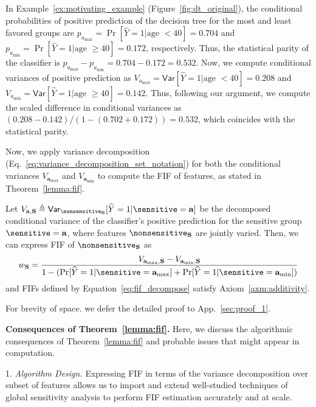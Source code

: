 \begin{example}
	In Example~\ref{ex:motivating_example} (Figure~\ref{fig:dt_original}), the conditional probabilities of positive prediction of the decision tree for the most and least favored groups are $  p_{a_{\max}} = \Pr[\widehat{Y} = 1 | \text{age } < 40] = 0.704 $ and $ p_{a_{\min}} = \Pr[\widehat{Y} = 1 | \text{age } \ge 40] = 0.172 $, respectively. Thus, the statistical parity of the classifier is $ p_{a_{\max}} - p_{a_{\min}} = 0.704 - 0.172 =  0.532 $. Now, we compute conditional variances of positive prediction as $ V_{a_{\max}} = \mathsf{Var}[\widehat{Y} = 1| \text{age } < 40] = 0.208 $ and $ V_{a_{\min}} = \mathsf{Var}[\widehat{Y} = 1| \text{age } \ge 40] = 0.142 $. Thus, following our argument, we compute the scaled difference in conditional variances as $ (0.208 - 0.142)/(1 - (0.702 + 0.172)) = 0.532 $, which coincides with the statistical parity.
\end{example}
Now, we apply variance decomposition (Eq.~\eqref{eq:variance_decomposition_set_notation}) for both the conditional variances $ V_{\mathbf{a}_{\max}} $ and $ V_{\mathbf{a}_{\min}} $ to compute the FIF of features, as stated in Theorem~\ref{lemma:fif}.
\begin{theorem}
	\label{lemma:fif}
	Let $ V_{\mathbf{a}, \mathbf{S}} \triangleq \mathsf{Var}_{\nonsensitive_{\mathbf{S}}}[\widehat{Y} = 1|\sensitive = \mathbf{a}] $ be the decomposed conditional variance of the classifier's positive prediction for the sensitive group $ \sensitive = \mathbf{a} $, where features $ \nonsensitive_{\mathbf{S}} $ are jointly varied. Then, we can express FIF of $ \nonsensitive_{\mathbf{S}} $ as
	\begin{equation}\label{eq:fif_decompose}
		w_{\mathbf{S}}  = \frac{V_{\mathbf{a}_{\max},\mathbf{S}} - V_{\mathbf{a}_{\min},\mathbf{S}}}{1 - (\Pr[\widehat{Y} = 1 |  \sensitive = \mathbf{a}_{\max}] + \Pr[\widehat{Y} = 1 |  \sensitive = \mathbf{a}_{\min}])}
	\end{equation}
	and FIFs defined by Equation~\eqref{eq:fif_decompose} satisfy Axiom~\ref{axm:additivity}.
\end{theorem}
For brevity of space. we defer the detailed proof to App.~\ref{sec:proof_1}.

\textbf{Consequences of Theorem~\ref{lemma:fif}.} Here, we discuss the algorithmic consequences of Theorem~\ref{lemma:fif} and probable issues that might appear in computation.

1. \textit{Algorithm Design.} Expressing FIF in terms of the variance decomposition over subset of features allows us to import and extend well-studied techniques of global sensitivity analysis to perform FIF estimation accurately and at scale.

